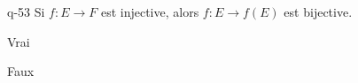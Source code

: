 \begin{truefalse}{q-53}
Si $f:E\to F$ est injective, alors $f:E\to f(E)$ est bijective.
\item* Vrai
\item Faux
\end{truefalse}

